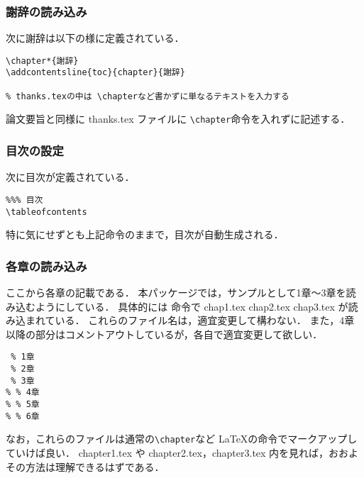 \subsubsection{謝辞の読み込み}
次に謝辞は以下の様に定義されている．
\begin{breakbox}
{\small
\begin{verbatim}
\chapter*{謝辞}
\addcontentsline{toc}{chapter}{謝辞}

% thanks.texの中は \chapterなど書かずに単なるテキストを入力する
\end{verbatim}
}
\end{breakbox}
論文要旨と同様に thanks.tex ファイルに \verb+\chapter+命令を入れずに記述する．

\subsubsection{目次の設定}
次に目次が定義されている．
\begin{breakbox}
{\small
\begin{verbatim}
%%% 目次
\tableofcontents
\end{verbatim}
}
\end{breakbox}
特に気にせずとも上記命令のままで，目次が自動生成される．

\subsubsection{各章の読み込み}
ここから各章の記載である．
本パッケージでは，サンプルとして1章〜3章を読み込むようにしている．
具体的には \verb++ 命令で chap1.tex chap2.tex chap3.tex が読み込まれている．
これらのファイル名は，適宜変更して構わない．
また，4章以降の部分はコメントアウトしているが，各自で適宜変更して欲しい．
\begin{breakbox}
{\small
\begin{verbatim}
 % 1章
 % 2章
 % 3章
% % 4章
% % 5章
% % 6章
\end{verbatim}
}
\end{breakbox}

なお，これらのファイルは通常の\verb+\chapter+など \LaTeX の命令でマークアップしていけば良い．
chapter1.tex や chapter2.tex，chapter3.tex 内を見れば，おおよその方法は理解できるはずである．

